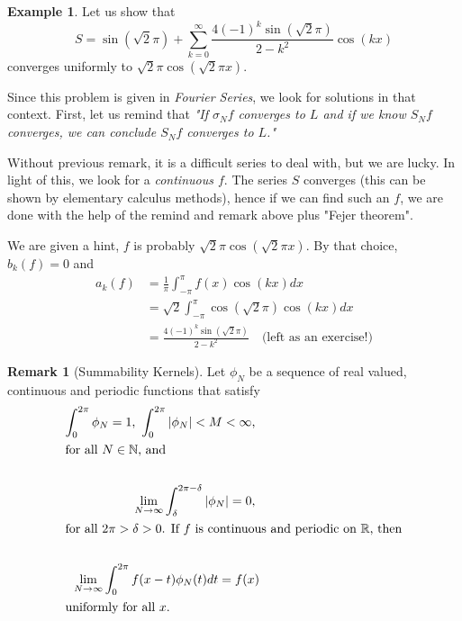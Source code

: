 \documentclass[12pt]{amsart}
\theoremstyle{definition}
\newtheorem{example}[theorem]{Example}
\newtheorem{remark}[theorem]{Remark}
\begin{document}
\begin{example}
    Let us show that
    \[
    S = \sin(\sqrt{2}\pi) + \sum_{k=0}^{\infty}\frac{4(-1)^k\sin(\sqrt{2}\pi)}{2-k^2}\cos(kx)
    \]
    converges uniformly to $\sqrt{2}\pi\cos(\sqrt{2}\pi x)$.
\end{example}


    Since this problem is given in \textit{Fourier Series}, we look for solutions in that context. First, let us remind that \textit{"If $\sigma_Nf$ converges to $L$ and if we know $S_Nf$ converges, we can conclude $S_Nf$ converges to $L$."}

    \par Without previous remark, it is a difficult series to deal with, but we are lucky. In light of this, we look for a \textit{continuous $f$}. The series $S$ converges (this can be shown by elementary calculus methods), hence if we can find such an \(f\), we are done with the help of the remind and remark above plus "Fejer theorem". \par

    We are given a hint, \(f\) is probably $\sqrt{2}\pi\cos(\sqrt{2}\pi x)$. By that choice, $b_k(f) = 0$ and
    \begin{align*}
        a_k(f) &= \frac{1}{\pi} \int_{-\pi}^{\pi} f(x) \cos(kx) dx \\
               &= \sqrt{2} \int_{-\pi}^{\pi}  \cos(\sqrt{2}\pi) \cos(kx) dx \\
               &= \frac{4(-1)^k\sin(\sqrt{2}\pi)}{2-k^2} \quad \text{(left as an exercise!)}
    \end{align*}


\begin{remark}[Summability Kernels] Let $\phi_N$ be a sequence of real valued, continuous and periodic functions that satisfy
\begin{align*}
    \int_{0}^{2\pi} \phi_N = 1 \text{, } \int_{0}^{2\pi} |\phi_N| < M < \infty \text{, }\\
    \intertext{for all $N \in \mathbb{N}$, and }\\
    \lim_{N \to \infty} \int_{\delta}^{2\pi - \delta} |\phi_N| = 0 \text{, }\\
    \intertext{for all $2\pi > \delta > 0$. If $f$ is continuous and periodic on $\mathbb{R}$, then}\\
    \lim_{N \to \infty} \int_{0}^{2\pi} f(x - t)\phi_N(t)dt = f(x)\\
    \intertext{uniformly for all $x$.}
\end{align*}
\end{remark}
\end{document}
